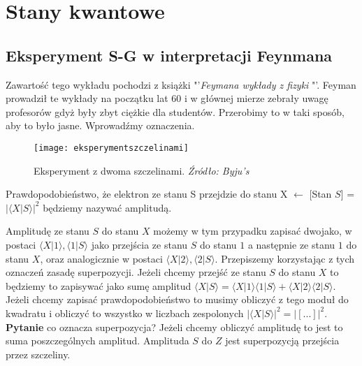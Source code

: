 \section{Stany kwantowe}

\subsection{Eksperyment S-G w interpretacji Feynmana}

Zawartość tego wykładu pochodzi z książki  "'\textit{Feymana wykłady z fizyki} "'. Feyman prowadził te wykłady na początku lat 60 i w głównej mierze zebrały uwagę profesorów gdyż były zbyt ciężkie dla studentów. Przerobimy to w taki sposób, aby to było jasne.
Wprowadźmy oznaczenia. 

\begin{minipage}{0.6 \textwidth}
	\begin{figure}[H]
		\centering
		\texttt{[image: eksperymentszczelinami]}
		\caption{Eksperyment z dwoma szczelinami. \newline \textit{Źródło: Byju's}}
		\label{fig:szczeliny2}
	\end{figure}
\end{minipage}
\begin{minipage}{0.35 \textwidth}
	Prawdopodobieństwo, że elektron ze stanu S przejdzie do stanu X \newline [Stan $X$] $\leftarrow$ [Stan $S$] = $\vert\langle X\vert S\rangle\vert^2$ będziemy nazywać amplitudą.
\end{minipage}

Amplitudę ze stanu $S$ do stanu $X$ możemy w tym przypadku zapisać dwojako, w postaci $\langle X\vert1\rangle, \langle 1\vert S\rangle$ jako przejścia ze stanu $S$ do stanu $1$ a następnie ze stanu $1$ do stanu $X$, oraz analogicznie w postaci $\langle X\vert2\rangle , \langle 2\vert S\rangle$. Przepiszemy korzystając z tych oznaczeń zasadę superpozycji. Jeżeli chcemy przejść ze stanu $S$ do stanu $X$ to będziemy to zapisywać jako sumę amplitud $\langle X\vert S\rangle = \langle X\vert1\rangle\langle 1\vert S\rangle + \langle X\vert2\rangle \langle 2\vert S\rangle$. Jeżeli chcemy zapisać prawdopodobieństwo to musimy obliczyć z tego moduł do kwadratu i obliczyć to wszystko w liczbach zespolonych $\vert\langle X\vert S\rangle \vert^2 = \vert[...]\vert^2$. 
\textbf{Pytanie} co oznacza superpozycja? Jeżeli chcemy obliczyć amplitudę to jest to suma poszczególnych amplitud. Amplituda $S$ do $Z$ jest superpozycją przejścia przez szczeliny.
